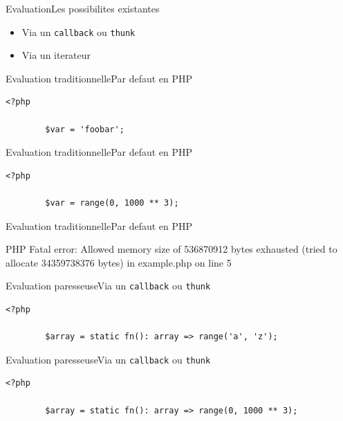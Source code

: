 \begin{frame}{Evaluation}{Les possibilites existantes}
    \begin{itemize}[<+->]
        \item Via un \texttt{callback} ou \texttt{thunk}
        \item Via un iterateur
    \end{itemize}
\end{frame}

\begin{frame}[fragile]{Evaluation traditionnelle}{Par defaut en PHP}
    \begin{lstlisting}[firstnumber=1]
        <?php

        $var = 'foobar';
    \end{lstlisting}
\end{frame}

\begin{frame}[fragile]{Evaluation traditionnelle}{Par defaut en PHP}
    \begin{lstlisting}[firstnumber=1]
        <?php

        $var = range(0, 1000 ** 3);
    \end{lstlisting}
\end{frame}

\begin{frame}[fragile]{Evaluation traditionnelle}{Par defaut en PHP}
    \begin{spverbatim}
        PHP Fatal error: Allowed memory size of 536870912 bytes exhausted (tried to allocate 34359738376 bytes) in example.php on line 5
    \end{spverbatim}
\end{frame}

\begin{frame}[fragile]{Evaluation paresseuse}{Via un \texttt{callback} ou \texttt{thunk}}
    \begin{lstlisting}[firstnumber=1]
        <?php

        $array = static fn(): array => range('a', 'z');
    \end{lstlisting}
\end{frame}

\begin{frame}[fragile]{Evaluation paresseuse}{Via un \texttt{callback} ou \texttt{thunk}}
    \begin{lstlisting}[firstnumber=1]
        <?php

        $array = static fn(): array => range(0, 1000 ** 3);
    \end{lstlisting}
\end{frame}

